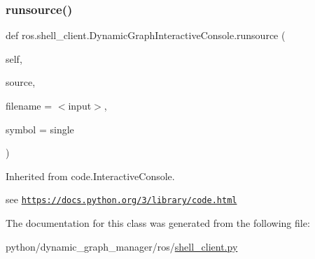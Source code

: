 \subsubsection{\texorpdfstring{runsource()}{runsource()}}
{\footnotesize\ttfamily def ros.\+shell\+\_\+client.\+Dynamic\+Graph\+Interactive\+Console.\+runsource (\begin{DoxyParamCaption}\item[{}]{self,  }\item[{}]{source,  }\item[{}]{filename = {\ttfamily \textquotesingle{}$<$input$>$\textquotesingle{}},  }\item[{}]{symbol = {\ttfamily \textquotesingle{}single\textquotesingle{}} }\end{DoxyParamCaption})}



Inherited from code.\+Interactive\+Console. 

see \href{https://docs.python.org/3/library/code.html}{\tt https\+://docs.\+python.\+org/3/library/code.\+html} 

The documentation for this class was generated from the following file\+:\begin{DoxyCompactItemize}
\item 
python/dynamic\+\_\+graph\+\_\+manager/ros/\hyperlink{shell__client_8py}{shell\+\_\+client.\+py}\end{DoxyCompactItemize}
